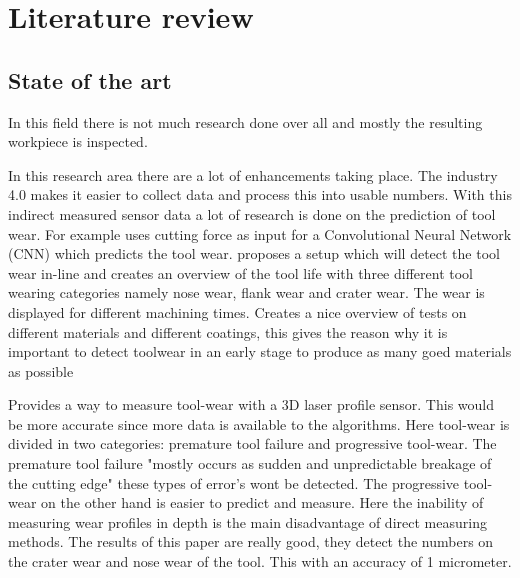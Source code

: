 
\chapter{Literature review}

\section{State of the art}

	In this field there is not much research done over all and mostly the resulting workpiece is inspected. 
           

		In this research area there are a lot of enhancements taking place. The industry 4.0 makes it easier to collect data and process this into usable numbers. With this indirect measured sensor data a lot of research is done on the prediction of tool wear. For example \cite{Ma2020} uses cutting force as input for a Convolutional Neural Network (CNN) which predicts the tool wear.
		 \cite{Li2013} proposes a setup which will detect the tool wear in-line and creates an overview of the tool life with three different tool wearing categories namely nose wear, flank wear and crater wear. The wear is displayed for different machining times.  Creates a nice overview of tests on different materials and different coatings, this gives the reason why it is important to detect toolwear in an early stage to produce as many goed materials as possible
		
		 \cite{Cerce2015} Provides a way to measure tool-wear with a 3D laser profile sensor. This would be more accurate since more data is available to the algorithms. Here tool-wear is divided in two categories: premature tool failure and progressive tool-wear. The premature tool failure "mostly occurs as sudden and unpredictable breakage of the cutting edge" these types of error's wont be detected. The progressive tool-wear on the other hand is easier to predict and measure. Here the inability of measuring wear profiles in depth is the main disadvantage of direct measuring methods. The results of this paper are really good, they detect the numbers on the crater wear and nose wear of the tool. This with an accuracy of 1 micrometer. 
		 
